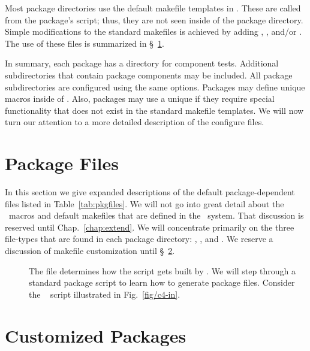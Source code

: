 Most package directories use the default makefile templates in
.  These are called from the package's
 script; thus, they are not seen inside of the
package directory.  Simple modifications to the standard makefiles is
achieved by adding , ,
and/or .  The use of these files is summarized in
\S~\ref{sec:package_files}. 

In summary, each package has a  directory for component
tests.  Additional subdirectories that contain package components may
be included.  All package subdirectories are configured using the same
options.  Packages may define unique macros inside of
.  Also, packages may use a unique
 if they require special functionality that does not
exist in the standard makefile templates.  We will now turn our
attention to a more detailed description of the configure files.


\section{Package Files}
\label{sec:package_files}

In this section we give expanded descriptions of the default
package-dependent files listed in Table~\ref{tab:pkgfiles}.  We will
not go into great detail about the \autoconf\ macros and default
makefiles that are defined in the \draco\ system.  That discussion is
reserved until Chap.~\ref{chap:extend}.  We will concentrate primarily
on the three file-types that are found in each package directory:
, , and
.  We reserve a discussion of makefile
customization until \S~\ref{sec:customize}.
\begin{description}
\item[] The
   file determines how the  script
  gets built by \autoconf.  We will step through a standard package
   script to learn how to generate package
   files.  Consider the \cfour\ 
  script illustrated in Fig.~\ref{fig/c4-in}.
\end{description}


\section{Customized Packages}
\label{sec:customize}




